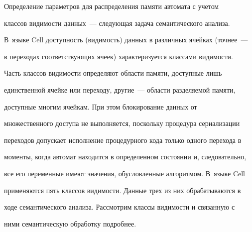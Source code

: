       


      Определение параметров для распределения памяти автомата с учетом 


классов видимости данных~--- следующая задача семантического анализа. 


В~языке Cell доступность (видимость) данных в различных ячейках (точнее~--- 


в переходах соответствующих ячеек) характеризуется классами видимости. 


Часть классов видимости определяют области памяти, доступные лишь 


единственной ячейке или переходу, другие~--- области разделяемой памяти, 


доступные многим ячейкам. При этом блокирование данных от 


множественного доступа не выполняется, поскольку процедура сериализации 


переходов допускает исполнение процедурного кода только одного перехода в 


моменты, когда автомат находится в определенном состоянии и, следовательно, 


все его переменные имеют значения, обусловленные алгоритмом. В~языке Cell 


применяются пять классов видимости. Данные трех из них обрабатываются в 


ходе семантического анализа. Рассмотрим классы видимости и связанную с 


ними семантическую обработку подробнее.



